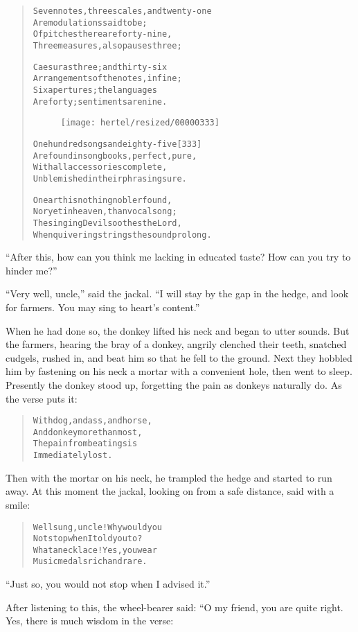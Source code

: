 \documentclass[article, twoside, 10pt]{memoir}
\renewenvironment{verbatim}{%
\begin{quote}%
\vskip -10pt%
\begin{alltt}\normalfont\small}{\end{alltt}%
\end{quote}%
\vskip -10pt
} %
\begin{document}
\begin{verbatim}
Seven notes, three scales, and twenty-one
    Are modulations said to be;
Of pitches there are forty-nine,
    Three measures, also pauses three;

Caesuras three; and thirty-six
    Arrangements of the notes, in fine;
Six apertures; the languages
    Are forty; sentiments are nine.

\begin{figure}[p]\texttt{[image: hertel/resized/00000333]}\end{figure}One hundred songs and eighty-five                       [333]
    Are found in songbooks, perfect, pure,
With all accessories complete,
    Unblemished in their phrasing sure.

On earth is nothing nobler found,
    Nor yet in heaven, than vocal song;
The singing Devil soothes the Lord,
    When quivering strings the sound prolong.
\end{verbatim}
``After this, how can you think me lacking in educated taste? How can you try to hinder me?''

``Very well, uncle,'' said the jackal.
``I will stay by the gap in the hedge, and look for farmers. You may sing to heart's content.''

When he had done so, the donkey lifted his neck and began to utter
sounds. But the farmers, hearing the bray of a donkey, angrily
clenched their teeth, snatched cudgels, rushed in, and beat him so
that he fell to the ground. Next they hobbled him by fastening on
his neck a mortar with a convenient hole, then went to sleep.
Presently the donkey stood up, forgetting the pain as donkeys
naturally do. As the verse puts it:

\begin{verbatim}
With dog, and ass, and horse,
    And donkey more than most,
The pain from beatings is
    Immediately lost.
\end{verbatim}
Then with the mortar on his neck, he trampled the hedge and started
to run away. At this moment the jackal, looking on from a safe
distance, said with a smile:

\begin{verbatim}
Well sung, uncle! Why would you
Not stop when I told you to?
What a necklace! Yes, you wear
Music medals rich and rare.
\end{verbatim}
``Just so, you would not stop when I advised it.''

After listening to this, the wheel-bearer said: “O my friend, you
are quite right. Yes, there is much wisdom in the verse:
\end{document}
